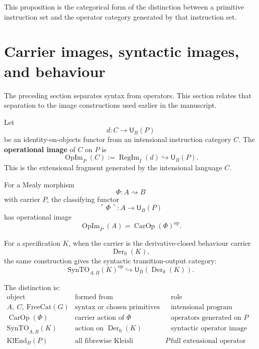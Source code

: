 This proposition is the categorical form of the distinction between a primitive instruction set
and the operator category generated by that instruction set.

\section{Carrier images, syntactic images, and behaviour}
\label{sec:carrier-syntactic-behaviour-images}

The preceding section separates syntax from operators.  This section relates that separation to
the image constructions used earlier in the manuscript.

Let
\[
        d:C\longrightarrow\mathsf U_B(P)
\]
be an identity-on-objects functor from an intensional instruction category \(C\).  The
\textbf{operational image} of \(C\) on \(P\) is
\[
        \operatorname{OpIm}_P(C)
        :=
        \operatorname{RegIm}_I(d)
        \hookrightarrow
        \mathsf U_B(P).
\]
This is the extensional fragment generated by the intensional language \(C\).

For a Mealy morphism
\[
        \Phi:A\rightsquigarrow B
\]
with carrier \(P\), the classifying functor
\[
        \ulcorner\Phi\urcorner:A\to\mathsf U_B(P)
\]
has operational image
\[
        \operatorname{OpIm}_P(A)
        =
        \operatorname{CarOp}(\Phi)^{\operatorname{op}}.
\]

For a specification \(K\), when the carrier is the derivative-closed behaviour carrier
\[
        \operatorname{Der}_0(K),
\]
the same construction gives the syntactic transition-output category:
\[
        \mathrm{SynTO}_{A,B}(K)^{\operatorname{op}}
        \hookrightarrow
        \mathsf U_B(\operatorname{Der}_0(K)).
\]

The distinction is:
\[
\begin{array}{c|c|c}
\text{object} & \text{formed from} & \text{role} \\ \hline
A,\ C,\ \mathrm{FreeCat}(G)
    & \text{syntax or chosen primitives}
    & \text{intensional program category} \\
\operatorname{CarOp}(\Phi)
    & \text{carrier action of }\Phi
    & \text{operators generated on }P \\
\mathrm{SynTO}_{A,B}(K)
    & \text{action on }\operatorname{Der}_0(K)
    & \text{syntactic operator image of a specification} \\
\mathrm{KlEnd}_B(P)
    & \text{all fibrewise Kleisli endomorphisms of }P
    & \text{full extensional operator category.}
\end{array}
\]

